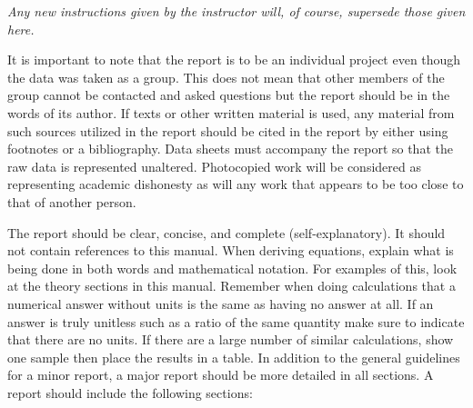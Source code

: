 \documentclass[main.tex]{subfiles}
\begin{document}
\emph{Any new instructions given by the instructor will, of course, supersede those given here.}

It is important to note that the report is to be an individual project even though the data was taken as a group.  This does not mean that other members of the group cannot be contacted and asked questions but the report should be in the words of its author.  If texts or other written material is used, any material from such sources utilized in the report should be cited in the report by either using footnotes or a bibliography. Data sheets must accompany the report so that the raw data is represented unaltered.  Photocopied work will be considered as representing academic dishonesty as will any work that appears to be too close to that of another person.

The report should be clear, concise, and complete (self-explanatory). It should not contain references to this manual. When deriving equations, explain what is being done in both words and mathematical notation. For examples of this, look at the theory sections in this manual. Remember when doing calculations that a numerical answer without units is the same as having no answer at all. If an answer is truly unitless such as a ratio of the same quantity make sure to indicate that there are no units. If there are a large number of similar calculations, show one sample then place the results in a table. In addition to the general guidelines for a minor report, a major report should be more detailed in all sections. A report should include the following sections:
\end{document}
